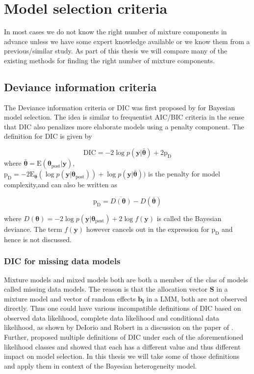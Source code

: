 
\chapter{Model selection criteria}
\label{ch : model_selection}

In most cases we do not know the right number of mixture components in advance unless we have some expert knowledge available or we know them from a previous/similar study. As part of this thesis we will compare many of the existing methods for finding the right number of mixture components.

\section{Deviance information criteria}
\label{sec : dic}

The Deviance information criteria or DIC was first proposed by \citet{spiegelhalter_bayesian_2002} for Bayesian model selection. The idea is similar to frequentist AIC/BIC criteria in the sense that DIC also penalizes more elaborate models using a penalty component. The definition for DIC is given by 

$$\text{DIC} = -2\log{p(\boldsymbol{y}|\boldsymbol{\bar{\theta}})} + 2\text{p}_\text{D}$$
where $\boldsymbol{\bar{\theta}} = \text{E}(\boldsymbol{\theta}_{\text{post}}|\boldsymbol{y})$,\\
$\text{p}_\text{D} = -2\text{E}_{\boldsymbol{\theta}}(\log{p(\boldsymbol{y}|\boldsymbol{\theta}_{\text{post}})}) + \log{p(\boldsymbol{y}|\boldsymbol{\bar{\theta}})})$ is the penalty for model complexity,and can also be written as 

$$\text{p}_\text{D}=\overline{D(\boldsymbol{\theta})} - D(\boldsymbol{\bar{\theta}})$$

where $D(\boldsymbol{\theta}) = -2\log{p(\boldsymbol{y}|\boldsymbol{\theta}_{\text{post}})} + 2\log{f(\boldsymbol{y})}$ is called the Bayesian deviance. The term $f(\boldsymbol{y})$ however cancels out in the expression for $\text{p}_\text{D}$ and hence is not discussed. 

\subsection{DIC for missing data models}
\label{subsec : DIC_missing_data_models}
Mixture models and mixed models both are both a member of the clas of models called missing data models. The reason is that the allocation vector $\boldsymbol{S}$ in a mixture model and vector of random effects $\boldsymbol{b_i}$ in a LMM, both are not observed directly. Thus one could have various incompatible definitions of DIC based on observed data likelihood, complete data likelihood and conditional data likelihood, as shown by DeIorio and Robert in a discussion on the paper of \citet{spiegelhalter_bayesian_2002}. Further, \citet{celeux_deviance_2006} proposed multiple definitions of DIC under each of the aforementioned likelihood classes and showed that each has a different value and thus different impact on model selection. In this thesis we will take some of those definitions and apply them in context of the Bayesian heterogeneity model. 


